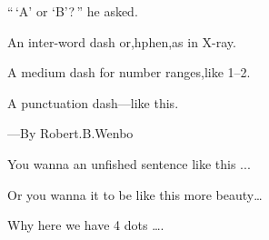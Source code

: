 \documentclass{article}
\begin{document}
	``\,`A' or `B'?\,'' he asked.
	
	An inter-word dash or,hphen,as in X-ray.
	
	A medium dash for number ranges,like 1--2.
	
	A punctuation dash---like this.
	\begin{flushright}
			---By Robert.B.Wenbo  
	\end{flushright}
							
	You wanna an unfished sentence like this ...
	
	Or you wanna it to be like this more beauty\ldots
	
	Why here we have 4 dots \ldots.
	
	
\end{document}
